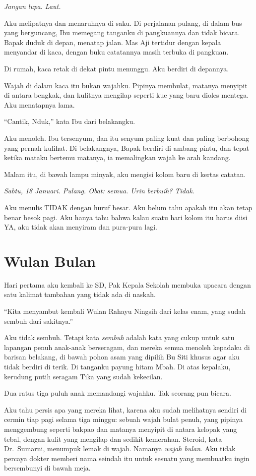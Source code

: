 \documentclass[11pt,twoside,openany]{book}
\begin{document}
\emph{Jangan lupa. Laut.}

Aku melipatnya dan menaruhnya di saku. Di perjalanan pulang, di dalam bus yang berguncang, Ibu memegang tanganku di pangkuannya dan tidak bicara. Bapak duduk di depan, menatap jalan. Mas Aji tertidur dengan kepala menyandar di kaca, dengan buku catatannya masih terbuka di pangkuan.

Di rumah, kaca retak di dekat pintu menunggu. Aku berdiri di depannya.

Wajah di dalam kaca itu bukan wajahku. Pipinya membulat, matanya menyipit di antara bengkak, dan kulitnya mengilap seperti kue yang baru dioles mentega. Aku menatapnya lama.

``Cantik, Nduk,'' kata Ibu dari belakangku.

Aku menoleh. Ibu tersenyum, dan itu senyum paling kuat dan paling berbohong yang pernah kulihat. Di belakangnya, Bapak berdiri di ambang pintu, dan tepat ketika mataku bertemu matanya, ia memalingkan wajah ke arah kandang.

Malam itu, di bawah lampu minyak, aku mengisi kolom baru di kertas catatan.

\emph{Sabtu, 18 Januari. Pulang. Obat: semua. Urin berbuih? Tidak.}

Aku menulis TIDAK dengan huruf besar. Aku belum tahu apakah itu akan tetap benar besok pagi. Aku hanya tahu bahwa kalau suatu hari kolom itu harus diisi YA, aku tidak akan menyiram dan pura-pura lagi.

\chapter{Wulan Bulan}
Hari pertama aku kembali ke SD, Pak Kepala Sekolah membuka upacara dengan satu kalimat tambahan yang tidak ada di naskah.

``Kita menyambut kembali Wulan Rahayu Ningsih dari kelas enam, yang sudah sembuh dari sakitnya.''

Aku tidak sembuh. Tetapi kata \emph{sembuh} adalah kata yang cukup untuk satu lapangan penuh anak-anak berseragam, dan mereka semua menoleh kepadaku di barisan belakang, di bawah pohon asam yang dipilih Bu Siti khusus agar aku tidak berdiri di terik. Di tanganku payung hitam Mbah. Di atas kepalaku, kerudung putih seragam Tika yang sudah kekecilan.

Dua ratus tiga puluh anak memandangi wajahku. Tak seorang pun bicara.

Aku tahu persis apa yang mereka lihat, karena aku sudah melihatnya sendiri di cermin tiap pagi selama tiga minggu: sebuah wajah bulat penuh, yang pipinya menggembung seperti bakpao dan matanya menyipit di antara kelopak yang tebal, dengan kulit yang mengilap dan sedikit kemerahan. Steroid, kata Dr.~Sumarni, menumpuk lemak di wajah. Namanya \emph{wajah bulan}. Aku tidak percaya dokter memberi nama seindah itu untuk sesuatu yang membuatku ingin bersembunyi di bawah meja.
\end{document}

